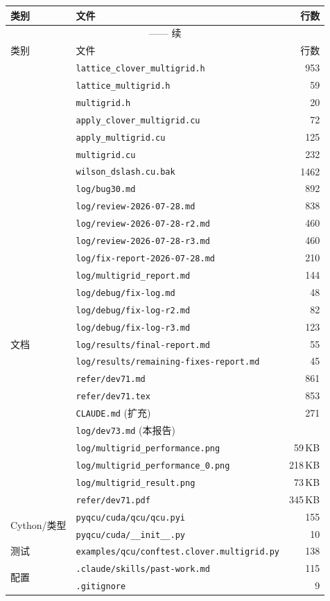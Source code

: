 \documentclass[11pt,a4paper]{article}
\begin{document}
\begin{longtable}{llr}
\toprule
类别 & 文件 & 行数 \\
\midrule
\endfirsthead
\multicolumn{3}{c}{\tablename{} \thetable{} —— 续} \\
\midrule
类别 & 文件 & 行数 \\
\midrule
\endhead
\bottomrule
\endfoot
\multirow{7}{*}{C++ 后端} & \texttt{lattice\_clover\_multigrid.h} & 953 \\
& \texttt{lattice\_multigrid.h} & 59 \\
& \texttt{multigrid.h} & 20 \\
& \texttt{apply\_clover\_multigrid.cu} & 72 \\
& \texttt{apply\_multigrid.cu} & 125 \\
& \texttt{multigrid.cu} & 232 \\
& \texttt{wilson\_dslash.cu.bak} & 1462 \\
\midrule
\multirow{19}{*}{文档} & \texttt{log/bug30.md} & 892 \\
& \texttt{log/review-2026-07-28.md} & 838 \\
& \texttt{log/review-2026-07-28-r2.md} & 460 \\
& \texttt{log/review-2026-07-28-r3.md} & 460 \\
& \texttt{log/fix-report-2026-07-28.md} & 210 \\
& \texttt{log/multigrid\_report.md} & 144 \\
& \texttt{log/debug/fix-log.md} & 48 \\
& \texttt{log/debug/fix-log-r2.md} & 82 \\
& \texttt{log/debug/fix-log-r3.md} & 123 \\
& \texttt{log/results/final-report.md} & 55 \\
& \texttt{log/results/remaining-fixes-report.md} & 45 \\
& \texttt{refer/dev71.md} & 861 \\
& \texttt{refer/dev71.tex} & 853 \\
& \texttt{CLAUDE.md} (扩充) & 271 \\
& \texttt{log/dev73.md} (本报告) &  \\
& \texttt{log/multigrid\_performance.png} & 59\,KB \\
& \texttt{log/multigrid\_performance\_0.png} & 218\,KB \\
& \texttt{log/multigrid\_result.png} & 73\,KB \\
& \texttt{refer/dev71.pdf} & 345\,KB \\
\midrule
\multirow{2}{*}{Cython/类型} & \texttt{pyqcu/cuda/qcu/qcu.pyi} & 155 \\
& \texttt{pyqcu/cuda/\_\_init\_\_.py} & 10 \\
\midrule
测试 & \texttt{examples/qcu/conftest.clover.multigrid.py} & 138 \\
\midrule
\multirow{2}{*}{配置} & \texttt{.claude/skills/past-work.md} & 115 \\
& \texttt{.gitignore} & 9 \\
\end{longtable}
\end{document}
